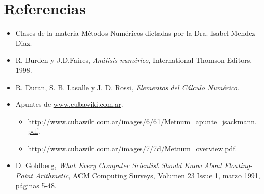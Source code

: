 \section{Referencias}

\begin{itemize}
\item Clases de la materia Métodos Numéricos dictadas por la Dra. Isabel Mendez Diaz.
\item R. Burden y J.D.Faires, \textit{Análisis numérico}, International Thomson Editors, 1998.
\item R. Duran, S. B. Lasalle y J. D. Rossi, \textit{Elementos del Cálculo Numérico}.
\item Apuntes de \url{www.cubawiki.com.ar}.
\begin{itemize}
	\item \url{http://www.cubawiki.com.ar/images/6/61/Metnum_apunte_jsackmann.pdf}.
	\item \url{http://www.cubawiki.com.ar/images/7/7d/Metnum_overview.pdf}.
\end{itemize}
\item D. Goldberg, \textit{What Every Computer Scientist Should Know About Floating-Point Arithmetic}, ACM Computing Surveys, Volumen 23 Issue 1, marzo 1991, páginas 5-48.
\end{itemize}